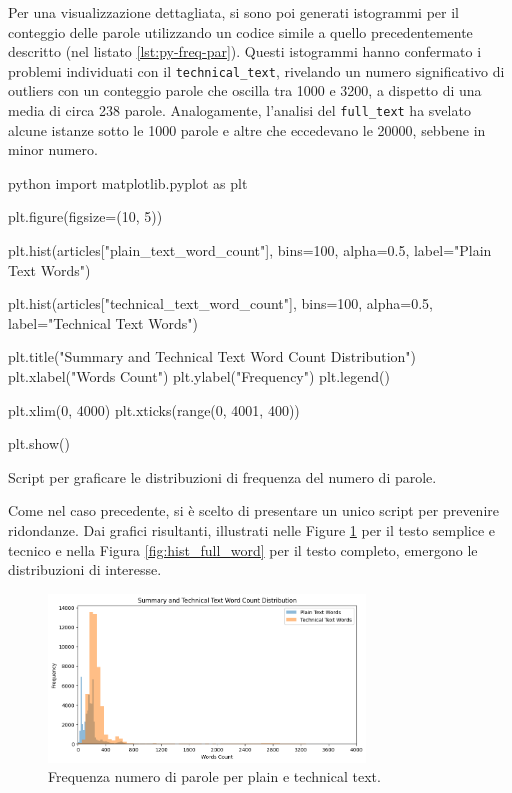 \documentclass[12pt,a4paper,twoside,openright]{book}
\begin{document}
Per una visualizzazione dettagliata, si sono poi generati istogrammi per il conteggio delle parole utilizzando un codice simile a quello precedentemente descritto (nel listato \ref{lst:py-freq-par}). Questi istogrammi hanno confermato i problemi individuati con il \texttt{technical\_text}, rivelando un numero significativo di outliers con un conteggio parole che oscilla tra 1000 e 3200, a dispetto di una media di circa 238 parole. Analogamente, l'analisi del \texttt{full\_text} ha svelato alcune istanze sotto le 1000 parole e altre che eccedevano le 20000, sebbene in minor numero.

\begin{customcode}
\begin{mintedbox}{python}
import matplotlib.pyplot as plt

plt.figure(figsize=(10, 5))

plt.hist(articles["plain_text_word_count"], bins=100, alpha=0.5, label="Plain Text Words")

plt.hist(articles["technical_text_word_count"], bins=100, alpha=0.5, label="Technical Text Words")

plt.title("Summary and Technical Text Word Count Distribution")
plt.xlabel("Words Count")
plt.ylabel("Frequency")
plt.legend()

plt.xlim(0, 4000)
plt.xticks(range(0, 4001, 400))

plt.show()
\end{mintedbox} 
\caption{Script per graficare le distribuzioni di frequenza del numero di parole.}
\label{lst:py-freq-par}
\end{customcode}

Come nel caso precedente, si è scelto di presentare un unico script per prevenire ridondanze. Dai grafici risultanti, illustrati nelle Figure \ref{fig:hist_tech_plain_word} per il testo semplice e tecnico e nella Figura \ref{fig:hist_full_word} per il testo completo, emergono le distribuzioni di interesse.

\begin{figure}
    \centering
    \includegraphics[width=0.75\textwidth]{images/sum_tech_wc_distrib.png}
    \caption{Frequenza numero di parole per plain e technical text.}
    \label{fig:hist_tech_plain_word}
\end{figure}
\end{document}
